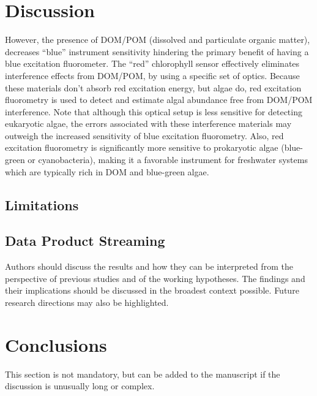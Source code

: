 \documentclass[journal,article,submit,pdftex,moreauthors]{Definitions/mdpi}
\begin{document}
\section{Discussion} \label{sec:discussion}

However, the presence of DOM/POM (dissolved and particulate organic matter), decreases “blue” instrument sensitivity hindering the primary benefit of having a blue excitation fluorometer. The “red” chlorophyll sensor effectively eliminates interference effects from DOM/POM, by using a specific set of optics. Because these materials don’t absorb red excitation energy, but algae do, red excitation fluorometry is used to detect and estimate algal abundance free from DOM/POM interference. Note that although this optical setup is less sensitive for detecting eukaryotic algae, the errors associated with these interference materials may outweigh the increased sensitivity of blue excitation fluorometry. Also, red excitation fluorometry is significantly more sensitive to prokaryotic algae (blue-green or cyanobacteria), making it a favorable instrument for freshwater systems which are typically rich in DOM and blue-green algae.  


\subsection{Limitations}

\subsection{Data Product Streaming}

Authors should discuss the results and how they can be interpreted from the perspective of previous studies and of the working hypotheses. The findings and their implications should be discussed in the broadest context possible. Future research directions may also be highlighted.

\section{Conclusions}

This section is not mandatory, but can be added to the manuscript if the discussion is unusually long or complex.


\vspace{6pt} 
\end{document}
